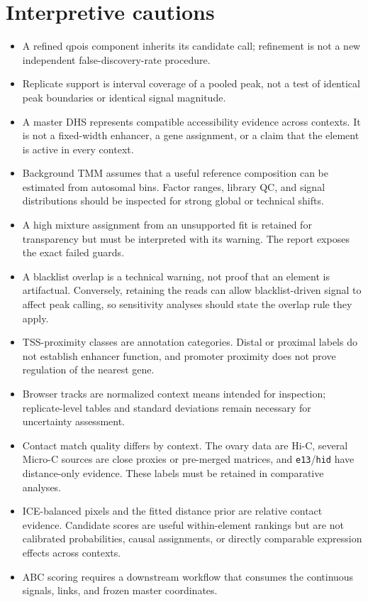 \documentclass[11pt]{article}
\begin{document}
\section{Interpretive cautions}

\begin{itemize}
  \item A refined qpois component inherits its candidate call; refinement is
  not a new independent false-discovery-rate procedure.
  \item Replicate support is interval coverage of a pooled peak, not a test of
  identical peak boundaries or identical signal magnitude.
  \item A master DHS represents compatible accessibility evidence across
  contexts.  It is not a fixed-width enhancer, a gene assignment, or a claim
  that the element is active in every context.
  \item Background TMM assumes that a useful reference composition can be
  estimated from autosomal bins.  Factor ranges, library QC, and signal
  distributions should be inspected for strong global or technical shifts.
  \item A high mixture assignment from an unsupported fit is retained for
  transparency but must be interpreted with its warning.  The report exposes
  the exact failed guards.
  \item A blacklist overlap is a technical warning, not proof that an element
  is artifactual.  Conversely, retaining the reads can allow blacklist-driven
  signal to affect peak calling, so sensitivity analyses should state the
  overlap rule they apply.
  \item TSS-proximity classes are annotation categories.  Distal or proximal
  labels do not establish enhancer function, and promoter proximity does not
  prove regulation of the nearest gene.
  \item Browser tracks are normalized context means intended for inspection;
  replicate-level tables and standard deviations remain necessary for
  uncertainty assessment.
  \item Contact match quality differs by context.  The ovary data are Hi-C,
  several Micro-C sources are close proxies or pre-merged matrices, and
  \texttt{e13}/\texttt{hid} have distance-only evidence.  These labels must be
  retained in comparative analyses.
  \item ICE-balanced pixels and the fitted distance prior are relative
  contact evidence.  Candidate scores are useful within-element rankings but
  are not calibrated probabilities, causal assignments, or directly
  comparable expression effects across contexts.
  \item ABC scoring requires a downstream workflow that consumes the
  continuous signals, links, and frozen master coordinates.
\end{itemize}
\end{document}
